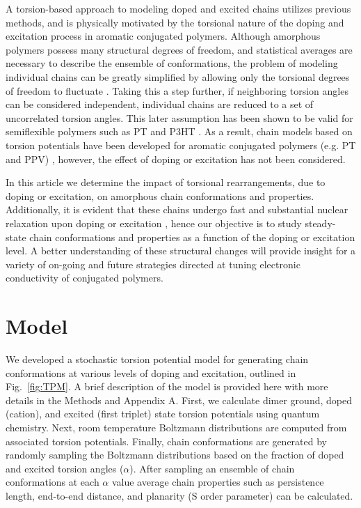 \clearpage

A torsion-based approach to modeling doped and excited chains utilizes previous methods, and is physically motivated by the torsional nature of the doping and excitation process in aromatic conjugated polymers. Although amorphous polymers possess many structural degrees of freedom, and statistical averages are necessary to describe the ensemble of conformations, the problem of modeling individual chains can be greatly simplified by allowing only the torsional degrees of freedom to fluctuate \cite{Flory1989}. Taking this a step further, if neighboring torsion angles can be considered independent, individual chains are reduced to a set of uncorrelated torsion angles. This later assumption has been shown to be valid for semiflexible polymers such as PT and P3HT \cite{Westenhoff2006, Zhang2014}. As a result, chain models based on torsion potentials have been developed for aromatic conjugated polymers (e.g. PT and PPV) \cite{Zhang2014, Claudio2001}, however, the effect of doping or excitation has not been considered.

In this article we determine the impact of torsional rearrangements, due to doping or excitation, on amorphous chain conformations and properties. Additionally, it is evident that these chains undergo fast and substantial nuclear relaxation upon doping or excitation \cite{Zhou2015, Busby2011}, hence our objective is to study steady-state chain conformations and properties as a function of the doping or excitation level. A better understanding of these structural changes will provide insight for a variety of on-going and future strategies directed at tuning electronic conductivity of conjugated polymers.

\section{Model}

We developed a stochastic torsion potential model for generating chain conformations at various levels of doping and excitation, outlined in Fig.~\ref{fig:TPM}. A brief description of the model is provided here with more details in the Methods and Appendix A. First, we calculate dimer ground, doped (cation), and excited (first triplet) state torsion potentials using quantum chemistry. Next, room temperature Boltzmann distributions are computed from associated torsion potentials. Finally, chain conformations are generated by randomly sampling the Boltzmann distributions based on the fraction of doped and excited torsion angles ($\alpha$). After sampling an ensemble of chain conformations at each $\alpha$ value average chain properties such as persistence length, end-to-end distance, and planarity (S order parameter) can be calculated.

